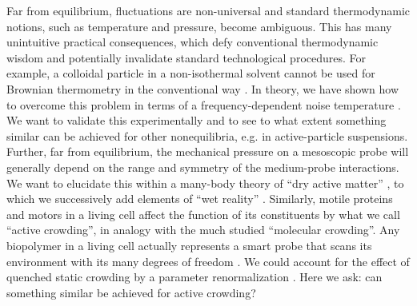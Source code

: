\begin{workpackage}[id=WPactive,wphases=0-48,
  short=Active Particle Suspensions,%
  title=Probing active particle suspensions with colloids and polymers,
  lead=ULEI,
  ULEIRM=96,UNIPDRM=6,USTUTTRM=2]
\begin{wpdescription}
%
%
Far from equilibrium, fluctuations are non-universal and standard thermodynamic notions,
such as temperature and pressure, become ambiguous.
This has many unintuitive practical consequences, which defy conventional thermodynamic
wisdom and potentially invalidate standard technological procedures.
%
For example, a colloidal particle in a non-isothermal solvent cannot be used for Brownian thermometry 
in the conventional way \cite{rings-etal:2010,kroy:2014}. In theory, we have shown how to overcome this problem
in terms of a frequency-dependent noise temperature \cite{falasco-etal:2014}.
%
We want to validate this experimentally and to see to what extent something similar can be achieved for other 
nonequilibria, e.g. in active-particle suspensions.
%
Further, far from equilibrium, the mechanical pressure on a mesoscopic probe will generally depend on the range and 
symmetry of the medium-probe interactions. 
%
We want to elucidate this within a many-body theory of ``dry active matter'' \cite{solon-etal:2015}, 
to which we successively add elements of ``wet reality'' \cite{zoettl-stark:2014}.
%
Similarly, motile proteins and motors in a living cell affect the function
of its constituents by what  we call ``active crowding'', in analogy with the much studied ``molecular crowding''. 
%
Any biopolymer in a living cell actually represents a smart probe that scans its environment with its many 
degrees of freedom \cite{otto-etal:2013}.
%
We could account for the effect of quenched static crowding by a parameter renormalization \cite{schoebl-etal:2014}.  
%
Here we ask: can something similar be achieved for active crowding?
\end{wpdescription}

\begin{tasklist}


\end{tasklist}
\end{workpackage}

